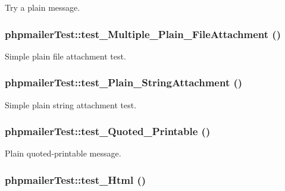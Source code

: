 Try a plain message. \hypertarget{classphpmailerTest_70b18cfe7255efd4c49aba3069f1930a}{
\subsubsection[test\_\-Multiple\_\-Plain\_\-FileAttachment]{\setlength{\rightskip}{0pt plus 5cm}phpmailerTest::test\_\-Multiple\_\-Plain\_\-FileAttachment ()}}
\label{classphpmailerTest_70b18cfe7255efd4c49aba3069f1930a}


Simple plain file attachment test. \hypertarget{classphpmailerTest_95091807289adb9addf8194efccb3f5d}{
\subsubsection[test\_\-Plain\_\-StringAttachment]{\setlength{\rightskip}{0pt plus 5cm}phpmailerTest::test\_\-Plain\_\-StringAttachment ()}}
\label{classphpmailerTest_95091807289adb9addf8194efccb3f5d}


Simple plain string attachment test. \hypertarget{classphpmailerTest_2d776453f3ada9b55b077a499e6f2d91}{
\subsubsection[test\_\-Quoted\_\-Printable]{\setlength{\rightskip}{0pt plus 5cm}phpmailerTest::test\_\-Quoted\_\-Printable ()}}
\label{classphpmailerTest_2d776453f3ada9b55b077a499e6f2d91}


Plain quoted-printable message. \hypertarget{classphpmailerTest_6cfde03f508f28f9cf68b127800ae799}{
\subsubsection[test\_\-Html]{\setlength{\rightskip}{0pt plus 5cm}phpmailerTest::test\_\-Html ()}}
\label{classphpmailerTest_6cfde03f508f28f9cf68b127800ae799}


